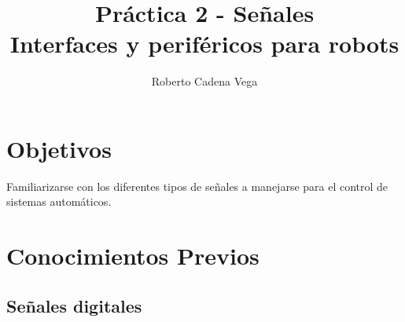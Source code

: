 



\title{Práctica 2 - Señales\\Interfaces y periféricos para robots}
\author{Roberto Cadena Vega} %
\date{}



\maketitle %


\section{Objetivos}

	Familiarizarse con los diferentes tipos de señales a manejarse para el control de sistemas automáticos.


\section{Conocimientos Previos}


	\subsection{Señales digitales}

